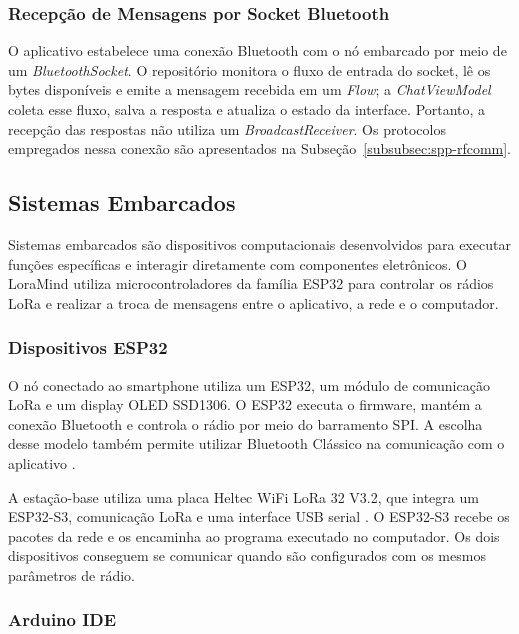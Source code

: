 \documentclass[12pt]{article}
\begin{document}
\subsubsection{Recepção de Mensagens por Socket Bluetooth}

O aplicativo estabelece uma conexão Bluetooth com o nó embarcado por meio de um \textit{BluetoothSocket}. O repositório monitora o fluxo de entrada do socket, lê os bytes disponíveis e emite a mensagem recebida em um \textit{Flow}; a \textit{ChatViewModel} coleta esse fluxo, salva a resposta e atualiza o estado da interface. Portanto, a recepção das respostas não utiliza um \textit{BroadcastReceiver}. Os protocolos empregados nessa conexão são apresentados na Subseção~\ref{subsubsec:spp-rfcomm}.

\subsection{Sistemas Embarcados}
\label{subsec:sistemas-embarcados}

Sistemas embarcados são dispositivos computacionais desenvolvidos para executar funções específicas e interagir diretamente com componentes eletrônicos. O LoraMind utiliza microcontroladores da família ESP32 para controlar os rádios LoRa e realizar a troca de mensagens entre o aplicativo, a rede e o computador.

\subsubsection{Dispositivos ESP32}

O nó conectado ao smartphone utiliza um ESP32, um módulo de comunicação LoRa e um display OLED SSD1306. O ESP32 executa o firmware, mantém a conexão Bluetooth e controla o rádio por meio do barramento SPI. A escolha desse modelo também permite utilizar Bluetooth Clássico na comunicação com o aplicativo \cite{espressifesp322026}.

A estação-base utiliza uma placa Heltec WiFi LoRa 32 V3.2, que integra um ESP32-S3, comunicação LoRa e uma interface USB serial \cite{espressifesp32s32026,heltecwifi32v32026}. O ESP32-S3 recebe os pacotes da rede e os encaminha ao programa executado no computador. Os dois dispositivos conseguem se comunicar quando são configurados com os mesmos parâmetros de rádio.

\subsubsection{Arduino IDE}
\end{document}
